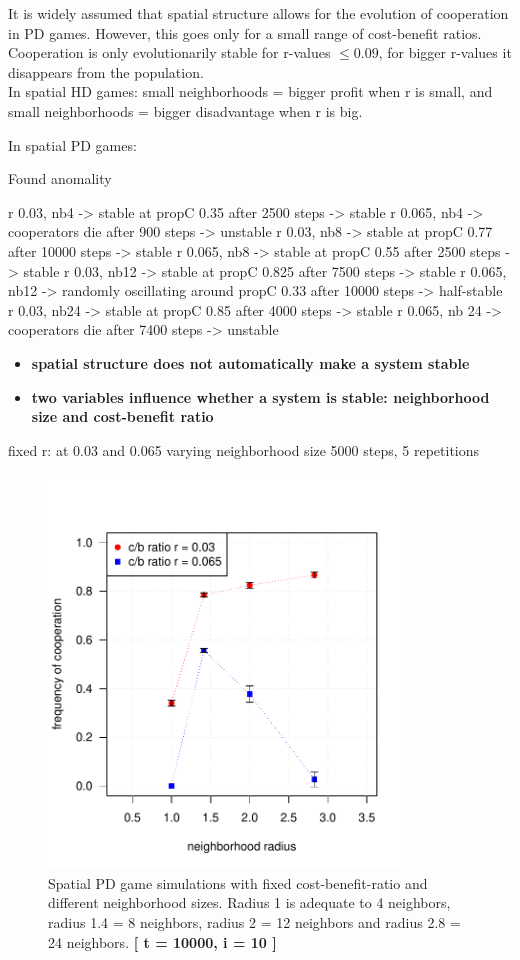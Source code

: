 It is widely assumed that spatial structure allows for the evolution of cooperation in PD games. However, this goes only for a small range of cost-benefit ratios. Cooperation is only evolutionarily stable for r-values $ \leq 0.09$, for bigger r-values it disappears from the population.\\
 
In spatial HD games: small neighborhoods = bigger profit when r is small, and small neighborhoods = bigger disadvantage when r is big.

In spatial PD games: 

Found anomality

r 0.03, nb4 -> stable at propC 0.35 after 2500 steps -> stable
r 0.065, nb4 -> cooperators die after 900 steps -> unstable
r 0.03, nb8 -> stable at propC 0.77 after 10000 steps -> stable
r 0.065, nb8 -> stable at propC 0.55 after 2500 steps -> stable
r 0.03, nb12 -> stable at propC 0.825 after 7500 steps -> stable
r 0.065, nb12 -> randomly oscillating around propC 0.33 after 10000 steps -> half-stable
r 0.03, nb24 -> stable at propC 0.85 after 4000 steps -> stable
r 0.065, nb 24 -> cooperators die after 7400 steps -> unstable

\begin{itemize}
\item{\textbf{spatial structure does not automatically make a system stable}}\\
\item{\textbf{two variables influence whether a system is stable: neighborhood size and cost-benefit ratio}}
\end{itemize}



fixed r: at 0.03 and 0.065
varying neighborhood size
5000 steps, 5 repetitions

\begin{figure}[H]
	\centering 
	\includegraphics[width=9.5cm]{task2_radiusplot}
	\caption{Spatial PD game simulations with fixed cost-benefit-ratio and different neighborhood sizes. Radius 1 is adequate to 4 neighbors, radius 1.4 = 8 neighbors, radius 2 = 12 neighbors and radius 2.8 = 24 neighbors.  \textbf{[ t = 10000, i = 10 ]} }\label{fig: task2_radiusplot}
\end{figure}


